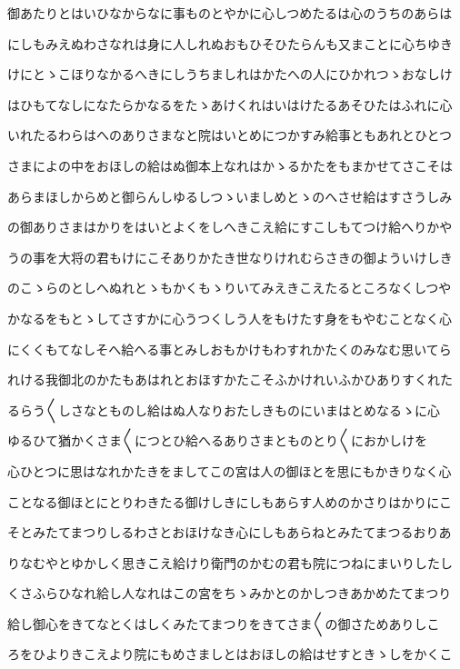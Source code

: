 \documentclass[a4paper,11pt,landscape]{ltjtarticle}
\begin{document}
御あたりとはいひなからなに事ものとやかに心しつめたるは心のうちのあらは
\par\medskip
にしもみえぬわさなれは身に人しれぬおもひそひたらんも又まことに心ちゆき
\par\medskip
けにとゝこほりなかるへきにしうちましれはかたへの人にひかれつゝおなしけ
\par\medskip
はひもてなしになたらかなるをたゝあけくれはいはけたるあそひたはふれに心
\par\medskip
いれたるわらはへのありさまなと院はいとめにつかすみ給事ともあれとひとつ
\par\medskip
さまによの中をおほしの給はぬ御本上なれはかゝるかたをもまかせてさこそは
\par\medskip
あらまほしからめと御らんしゆるしつゝいましめとゝのへさせ給はすさうしみ
\par\medskip
の御ありさまはかりをはいとよくをしへきこえ給にすこしもてつけ給へりかや
\par\medskip
うの事を大将の君もけにこそありかたき世なりけれむらさきの御よういけしき
\par\medskip
のこゝらのとしへぬれとゝもかくもゝりいてみえきこえたるところなくしつや
\par\medskip
かなるをもとゝしてさすかに心うつくしう人をもけたす身をもやむことなく心
\par\medskip
にくくもてなしそへ給へる事とみしおもかけもわすれかたくのみなむ思いてら
\par\medskip
れける我御北のかたもあはれとおほすかたこそふかけれいふかひありすくれた
\par\medskip
るらう〱しさなとものし給はぬ人なりおたしきものにいまはとめなるゝに心
\par\medskip
ゆるひて猶かくさま〱につとひ給へるありさまとものとり〱におかしけを
\par\medskip
心ひとつに思はなれかたきをましてこの宮は人の御ほとを思にもかきりなく心
\par\medskip
ことなる御ほとにとりわきたる御けしきにしもあらす人めのかさりはかりにこ
\par\medskip
そとみたてまつりしるわさとおほけなき心にしもあらねとみたてまつるおりあ
\par\medskip
りなむやとゆかしく思きこえ給けり衛門のかむの君も院につねにまいりしたし
\par\medskip
くさふらひなれ給し人なれはこの宮をちゝみかとのかしつきあかめたてまつり
\par\medskip
給し御心をきてなとくはしくみたてまつりをきてさま〱の御さためありしこ
\par\medskip
ろをひよりきこえより院にもめさましとはおほしの給はせすときゝしをかくこ
\end{document}

